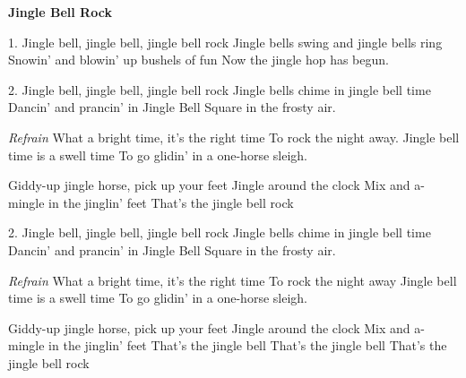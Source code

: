 \documentclass[10pt]{article}
\begin{document}
{\Large
\begin{guitar}
    \textbf{Jingle Bell Rock}


    1. Jingle bell, jingle bell, jingle bell rock
    Jingle bells swing and jingle bells ring
    Snowin' and blowin' up bushels of fun
    Now the jingle hop has begun.

    2. Jingle bell, jingle bell, jingle bell rock
    Jingle bells chime in jingle bell time
    Dancin' and prancin' in Jingle Bell Square
    in the frosty air.

    \emph{Refrain} What a bright time, it's the right time
    To rock the night away.
    Jingle bell time is a swell time
    To go glidin' in a one-horse sleigh.

    Giddy-up jingle horse, pick up your feet
    Jingle around the clock
    Mix and a-mingle in the jinglin' feet
    That's the jingle bell rock

    2. Jingle bell, jingle bell, jingle bell rock
    Jingle bells chime in jingle bell time
    Dancin' and prancin' in Jingle Bell Square
    in the frosty air.

    \emph{Refrain} What a bright time, it's the right time
    To rock the night away
    Jingle bell time is a swell time
    To go glidin' in a one-horse sleigh.

    Giddy-up jingle horse, pick up your feet
    Jingle around the clock
    Mix and a-mingle in the jinglin' feet
    That's the jingle bell
    That's the jingle bell
    That's the jingle bell rock
\end{guitar}
}
\end{document}
